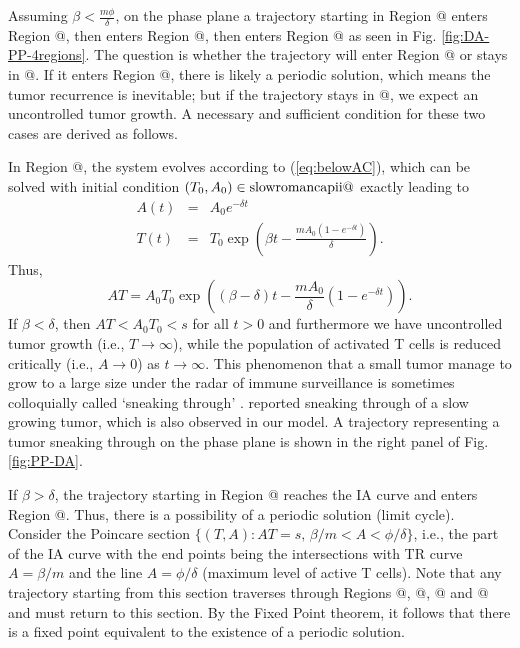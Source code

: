 \documentclass[review,authoryear]{elsarticle}
\makeatletter
\newcommand*{\rom}[1]{\expandafter\@slowromancap\romannumeral #1@}
\makeatother
\begin{document}
Assuming $\beta<\frac{m\phi}{\delta}$, on the phase plane a trajectory starting in Region \rom{3}
enters Region \rom{4}, then enters Region \rom{1}, then enters Region \rom{2} as seen in Fig. \ref{fig:DA-PP-4regions}.
The question is whether the trajectory will enter Region \rom{3} or stays in \rom{2}. If it enters Region \rom{3},
there is likely a periodic solution, which means the tumor recurrence is inevitable; but if the trajectory stays in \rom{2}, we expect an uncontrolled tumor growth. A necessary and sufficient condition for these two cases are derived as follows.

In Region \rom{2}, the system evolves according to (\ref{eq:belowAC}), which
can be solved with initial condition $(T_{0},A_{0})\in\text{\rom{2}}$
exactly leading to 
\begin{eqnarray}
A(t) & = & A_{0}e^{-\delta t}\nonumber \\
T(t) & = & T_{0}\exp(\beta t-\frac{mA_{0}(1-e^{-\delta t})}{\delta})\label{eq:soln belowAC}.
\end{eqnarray}
Thus,
\begin{equation}
AT=A_{0}T_{0}\exp((\beta-\delta)t-\frac{mA_{0}}{\delta}(1-e^{-\delta t})).
\end{equation} 
If $\beta<\delta$, then $AT<A_{0}T_{0}<s$ for all $t>0$ and furthermore
we have uncontrolled tumor growth (i.e., $T\to\infty$), while the population of activated T cells is reduced critically (i.e., $A\to0$) as $t\to\infty$. This phenomenon that a small tumor manage to grow to a large size under the radar of immune surveillance is sometimes colloquially called `sneaking through' \citep{KUZNETSOV1994}.  \cite{George2018} reported sneaking through of a slow growing tumor, which is also observed in our
model. A trajectory representing a tumor sneaking through on the phase
plane is shown in the right panel of Fig. \ref{fig:PP-DA}. 

If $\beta>\delta$, the trajectory starting in Region \rom{2} reaches the IA curve 
and enters Region \rom{3}. Thus, there is a possibility of a periodic solution (limit cycle). Consider
the Poincare section $\{(T,A):AT=s,\,\beta/m<A<\phi/\delta \}$, i.e., the part of the IA curve with the end points being 
the intersections with TR curve $A=\beta/m$ 
and the line $A=\phi / \delta$ (maximum level of active T cells).
Note that any trajectory starting from this section traverses through Regions \rom{1}, \rom{2}, \rom{3} and \rom{4} and must
return to this section. By the Fixed Point theorem, it follows that there is
a fixed point equivalent to the existence of a periodic solution. 
\end{document}
